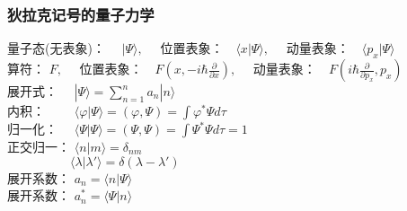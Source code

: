 \begin{frame} 
    \frametitle{狄拉克记号的量子力学}  
    量子态(无表象)： $\hspace{1em}|\Psi \rangle, \quad$ 位置表象：$\hspace{1em} \langle x |\Psi \rangle , \quad$ 动量表象：$\hspace{1em} \langle p_x |\Psi \rangle$ \\ \vspace{0.1em}
    算符： $F, \quad$ 位置表象：$\hspace{1em} F(x, -i\hbar \frac{\partial }{\partial x}) , \quad$ 动量表象：$\hspace{1em} F(i\hbar \frac{\partial }{\partial p_x}, p_x) $ \\ \vspace{0.1em}
    展开式： $\hspace{1em}|\Psi \rangle =\sum\limits_{n=1} ^n a_n |n \rangle$ \\
    内积：   $\hspace{2em}\langle \varphi | \Psi \rangle = (\varphi, \Psi)= \int \varphi^*\Psi d\tau $ \\  \vspace{0.1em}
    归一化： $\hspace{1em}\langle \Psi | \Psi \rangle = (\Psi, \Psi)= \int \Psi^*\Psi d\tau = 1 $ \\ \vspace{0.1em}
    正交归一： $\langle n | m \rangle = \delta_{nm} $ \\ \vspace{0.1em}
    $ \hspace{5em} \langle \lambda | \lambda' \rangle = \delta(\lambda-\lambda') $\\ \vspace{0.2em}
    展开系数： $ a_n= \langle n | \Psi \rangle$ \\ \vspace{0.2em}
    展开系数： $ a_n ^*= \langle \Psi | n \rangle$ \\ \vspace{0.2em}
\end{frame} 
 
